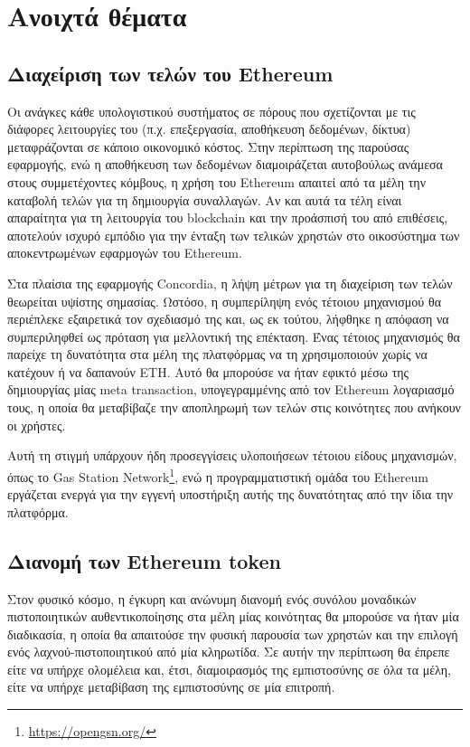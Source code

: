 \section{Ανοιχτά θέματα}\label{section:5-2-open-areas}

\subsection{Διαχείριση των τελών του Ethereum}\label{subsection:5-2-1-ethereum-fees-management}

Οι ανάγκες κάθε υπολογιστικού συστήματος σε πόρους που σχετίζονται με τις διάφορες λειτουργίες του (π.χ. επεξεργασία, αποθήκευση δεδομένων, δίκτυα) μεταφράζονται σε κάποιο οικονομικό κόστος. Στην περίπτωση της παρούσας εφαρμογής, ενώ η αποθήκευση των δεδομένων διαμοιράζεται αυτοβούλως ανάμεσα στους συμμετέχοντες κόμβους, η χρήση του Ethereum απαιτεί από τα μέλη την καταβολή τελών για τη δημιουργία συναλλαγών. Αν και αυτά τα τέλη είναι απαραίτητα για τη λειτουργία του blockchain και την προάσπισή του από επιθέσεις, αποτελούν ισχυρό εμπόδιο για την ένταξη των τελικών χρηστών στο οικοσύστημα των αποκεντρωμένων εφαρμογών του Ethereum.

Στα πλαίσια της εφαρμογής Concordia, η λήψη μέτρων για τη διαχείριση των τελών θεωρείται υψίστης σημασίας. Ωστόσο, η συμπερίληψη ενός τέτοιου μηχανισμού θα περιέπλεκε εξαιρετικά τον σχεδιασμό της και, ως εκ τούτου, λήφθηκε η απόφαση να συμπεριληφθεί ως πρόταση για μελλοντική της επέκταση. Ένας τέτοιος μηχανισμός θα παρείχε τη δυνατότητα στα μέλη της πλατφόρμας να τη χρησιμοποιούν χωρίς να κατέχουν ή να δαπανούν ETH. Αυτό θα μπορούσε να ήταν εφικτό μέσω της δημιουργίας μίας meta transaction, υπογεγραμμένης από τον Ethereum λογαριασμό τους, η οποία θα μεταβίβαζε την αποπληρωμή των τελών στις κοινότητες που ανήκουν οι χρήστες.

Αυτή τη στιγμή υπάρχουν ήδη προσεγγίσεις υλοποιήσεων τέτοιου είδους μηχανισμών, όπως το Gas Station Network\footnote{\url{https://opengsn.org/}}, ενώ η προγραμματιστική ομάδα του Ethereum εργάζεται ενεργά για την εγγενή υποστήριξη αυτής της δυνατότητας από την ίδια την πλατφόρμα.

\subsection{Διανομή των Ethereum token}\label{subsection:5-2-2-token-distribution}

Στον φυσικό κόσμο, η έγκυρη και ανώνυμη διανομή ενός συνόλου μοναδικών πιστοποιητικών αυθεντικοποίησης στα μέλη μίας κοινότητας θα μπορούσε να ήταν μία διαδικασία, η οποία θα απαιτούσε την φυσική παρουσία των χρηστών και την επιλογή ενός λαχνού-πιστοποιητικού από μία κληρωτίδα. Σε αυτήν την περίπτωση θα έπρεπε είτε να υπήρχε ολομέλεια και, έτσι, διαμοιρασμός της εμπιστοσύνης σε όλα τα μέλη, είτε να υπήρχε μεταβίβαση της εμπιστοσύνης σε μία επιτροπή.

